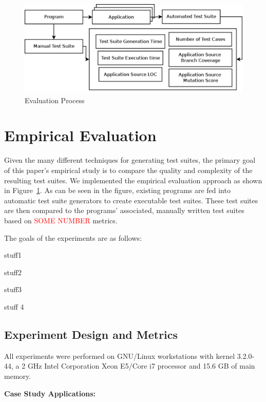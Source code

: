 
\begin{figure}[!t]
\centering
\captionsetup{justification=centering}
  \includegraphics[width=\linewidth]{proccess_diagram.pdf}
    \caption{Evaluation Process}
  \label{fig:process_diagram}
\end{figure}

\section{Empirical Evaluation}
\label{sec:evaluation}
Given the many different techniques for generating test suites, the primary goal of this paper's empirical study is to compare the quality and complexity of the resulting test suites.  We implemented the empirical evaluation approach as shown in Figure~\ref{fig:process_diagram}.  As can be seen in the figure, existing programs are fed into automatic test suite generators to create executable test suites.  These test suites are then compared to the programs' associated, manually written test suites based on \textcolor{red}{SOME NUMBER} metrics.   

The goals of the experiments are as follows:
\squishlist
\item stuff1
\item stuff2
\item stuff3
\item stuff 4
\squishend

\subsection{Experiment Design and Metrics}
All experiments were performed on GNU/Linux workstations with kernel 3.2.0-44, a 2 GHz Intel Corporation Xeon E5/Core i7 processor and  15.6 GB of main memory. 

\noindent \textbf{Case Study Applications:}  

